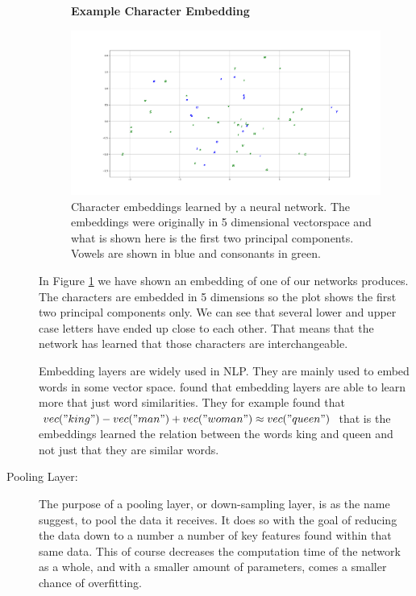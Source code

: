 \begin{description}
        \begin{figure}
            \centering
            \textbf{Example Character Embedding}\par\medskip
            \includegraphics[width=\textwidth]{./pictures/method/example_character_embeddings.png}
            \caption{Character embeddings learned by a neural network. The
                embeddings were originally in 5 dimensional vectorspace and what
                is shown here is the first two principal components. Vowels are
                shown in blue and consonants in green.}
            \label{fig:embeddings}
        \end{figure}

        In Figure \ref{fig:embeddings} we have shown an embedding of one of our
        networks produces. The characters are embedded in 5 dimensions so the
        plot shows the first two principal components only. We can see that
        several lower and upper case letters have ended up close to each other.
        That means that the network has learned that those characters are
        interchangeable.

        Embedding layers are widely used in \gls{NLP}. They are mainly used
        to embed words in some vector space. \citet{mikolov2013linguistic}
        found that embedding layers are able to learn more that just word
        similarities. They for example found that $vec("king") - vec("man") +
        vec("woman") \approx vec("queen")$ that is the embeddings learned the
        relation between the words king and queen and not just that they are
        similar words.

    \item[Pooling Layer:]

        The purpose of a pooling layer, or down-sampling layer, is as the name
        suggest, to pool the data it receives. It does so with the goal of
        reducing the data down to a number a number of key features found within
        that same data. This of course decreases the computation time of the
        network as a whole, and with a smaller amount of parameters, comes a
        smaller chance of overfitting.


\end{description}
